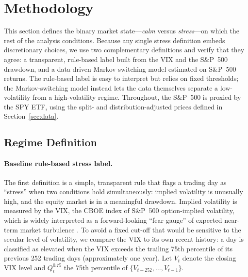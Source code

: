 
\section{Methodology}
\label{sec:methodology}

This section defines the binary market state---\emph{calm} versus \emph{stress}---on which the rest of the analysis conditions. Because any single stress definition embeds discretionary choices, we use two complementary definitions and verify that they agree: a transparent, rule-based label built from the VIX and the S\&P~500 drawdown, and a data-driven Markov-switching model estimated on S\&P~500 returns. The rule-based label is easy to interpret but relies on fixed thresholds; the Markov-switching model instead lets the data themselves separate a low-volatility from a high-volatility regime. Throughout, the S\&P~500 is proxied by the SPY ETF, using the split- and distribution-adjusted prices defined in Section~\ref{sec:data}.

\subsection{Regime Definition}
\label{subsec:regime_definition}

\paragraph{Baseline rule-based stress label.}
The first definition is a simple, transparent rule that flags a trading day as ``stress'' when two conditions hold simultaneously: implied volatility is unusually high, and the equity market is in a meaningful drawdown. Implied volatility is measured by the VIX, the CBOE index of S\&P~500 option-implied volatility, which is widely interpreted as a forward-looking ``fear gauge'' of expected near-term market turbulence \citep{whaley2009understanding}. To avoid a fixed cut-off that would be sensitive to the secular level of volatility, we compare the VIX to its own recent history: a day is classified as elevated when the VIX exceeds the trailing 75th percentile of its previous 252 trading days (approximately one year). Let $V_t$ denote the closing VIX level and $Q^{0.75}_{t}$ the 75th percentile of $\{V_{t-252}, \dots, V_{t-1}\}$.

